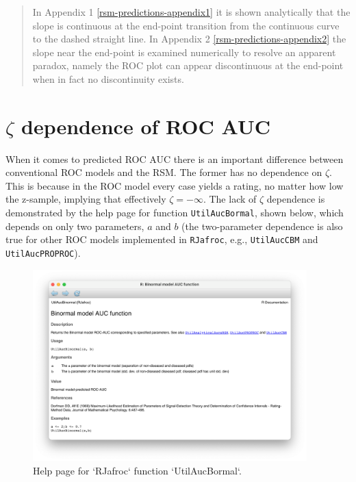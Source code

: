 \documentclass[
]{book}
\begin{document}
\begin{quote}
In Appendix 1 \ref{rsm-predictions-appendix1} it is shown analytically that the slope is continuous at the end-point transition from the continuous curve to the dashed straight line. In Appendix 2 \ref{rsm-predictions-appendix2} the slope near the end-point is examined numerically to resolve an apparent paradox, namely the ROC plot can appear discontinuous at the end-point when in fact no discontinuity exists.
\end{quote}

\hypertarget{rsm-predictions-roc-curve-aucs-zeta1}{%
\section{\texorpdfstring{\(\zeta\) dependence of ROC AUC}{\textbackslash zeta dependence of ROC AUC}}\label{rsm-predictions-roc-curve-aucs-zeta1}}

When it comes to predicted ROC AUC there is an important difference between conventional ROC models and the RSM. The former has no dependence on \(\zeta\). This is because in the ROC model every case yields a rating, no matter how low the z-sample, implying that effectively \(\zeta = -\infty\). The lack of \(\zeta\) dependence is demonstrated by the help page for function \texttt{UtilAucBormal}, shown below, which depends on only two parameters, \(a\) and \(b\) (the two-parameter dependence is also true for other ROC models implemented in \texttt{RJafroc}, e.g., \texttt{UtilAucCBM} and \texttt{UtilAucPROPROC}).

\begin{figure}

{\centering \includegraphics[width=300pt]{images/rsm-predictions/util-aucs-binormal} 

}

\caption{Help page for `RJafroc` function `UtilAucBormal`.}\label{fig:rsm-predictions-binorml-help}
\end{figure}
\end{document}
